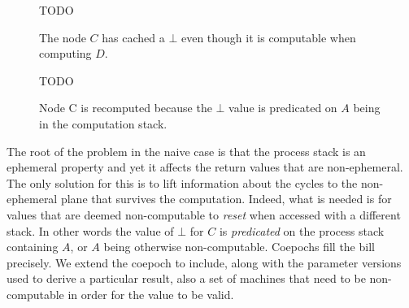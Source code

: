\begin{figure}[H]
TODO
\caption{\label{fig:wrong} The node \(C\) has cached a \(\bot\) even
  though it is computable when computing \(D\).}
\end{figure}

\begin{figure}[H]
  TODO
\caption{\label{fig:correct} Node C is recomputed
 because the \(\bot\) value is predicated on \(A\) being in the computation stack.}
\end{figure}

The root of the problem in the naive case is that the process stack is
an ephemeral property and yet it affects the return values that are
non-ephemeral. The only solution for this is to lift information about
the cycles to the non-ephemeral plane that survives the
computation. Indeed, what is needed is for values that are deemed
non-computable to \emph{reset} when accessed with a different stack. In
other words the value of \(\bot\) for \(C\) is \emph{predicated} on the
process stack containing \(A\), or \(A\) being otherwise
non-computable. Coepochs fill the bill precisely. We extend the coepoch
to include, along with the parameter versions used to derive a
particular result, also a set of machines that need to be
non-computable in order for the value to be valid.

